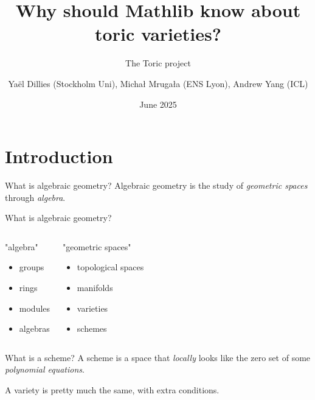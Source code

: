 \documentclass[10pt, handout]{beamer}
\title{Why should Mathlib know about toric varieties?}
\subtitle{The Toric project}
\date{\nth{24} June 2025}
\author{\texorpdfstring{\alert{Yaël Dillies (Stockholm Uni)}}{Yaël Dillies (Stockholm Uni)}, Michał Mrugała (ENS Lyon), Andrew Yang (ICL)}
\institute{British Mathematical Colloquium}
\begin{document}
\maketitle


\section{Introduction}


\begin{frame}{What is algebraic geometry?}
    Algebraic geometry is the study of \emph{geometric spaces} through \emph{algebra}.
\end{frame}


\begin{frame}{What is algebraic geometry?}
  \begin{columns}[T,onlytextwidth]

      \begin{block}{"algebra"}
        \begin{itemize}
            \item groups
            \item rings
            \item modules
            \item algebras
        \end{itemize}
      \end{block}

    \pause

      \begin{block}{"geometric spaces"}
        \begin{itemize}
            \item topological spaces
            \item manifolds
            \item varieties
            \item schemes
        \end{itemize}
      \end{block}

  \end{columns}
\end{frame}


\begin{frame}{What is a scheme?}
    A scheme is a space that \emph{locally} looks like the zero set of some \emph{polynomial equations}.

    \pause

    A variety is pretty much the same, with extra conditions.
\end{frame}
\end{document}
